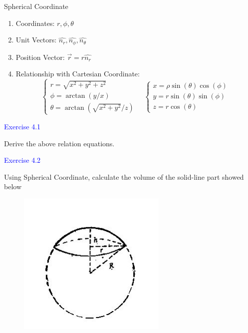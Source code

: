 \documentclass{beamer}
\begin{document}
\begin{frame}{Spherical Coordinate}
  \begin{enumerate}
    \item Coordinates: $r, \phi, \theta$
    \item Unit Vectors: $\hat{n_r}, \hat{n_\phi}, \hat{n_{\theta}}$
    \item Position Vector: $\vec{r} = r\hat{n_r}$
    \item Relationship with Cartesian Coordinate:$$\left\{\begin{array} { l } 
      { r = \sqrt { x ^ { 2 } + y ^ { 2 } + z ^ { 2 } } } \\
      { \phi = \operatorname { a r c t a n } ( y / x ) } \\
      { \theta = \operatorname { a r c t a n } ( \sqrt { x ^ { 2 } + y ^ { 2 } } / z ) }
      \end{array} \quad \left\{\begin{array}{l}
      x=\rho \sin (\theta) \cos (\phi) \\
      y=r \sin (\theta) \sin (\phi) \\
      z=r \cos (\theta)
      \end{array}\right.\right.$$
  \end{enumerate}
\end{frame}

\begin{frame}
\textcolor{blue}{Exercise 4.1}

Derive the above relation equations.
\end{frame}

\begin{frame}
\textcolor{blue}{Exercise 4.2}

Using Spherical Coordinate, calculate the volume of the solid-line part showed below
\begin{figure}[htbp]
\centering
\includegraphics[width=0.5 \linewidth, angle =0]{qiuque.png}
\end{figure}
\end{frame}
\end{document}
